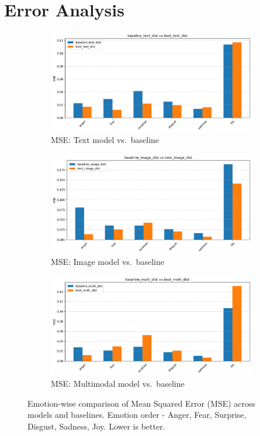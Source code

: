 \section{Error Analysis}
\label{sec:error-analysis}


\begin{figure}[h]
    \centering
    \begin{subfigure}[b]{0.48\textwidth}
        \includegraphics[width=\textwidth]{images/plot_1.png}
        \caption{MSE: Text model vs.\ baseline}
        \label{fig:mse-text}
    \end{subfigure}
    \hfill
    \begin{subfigure}[b]{0.48\textwidth}
        \includegraphics[width=\textwidth]{images/plot_2.png}
        \caption{MSE: Image model vs.\ baseline}
        \label{fig:mse-img}
    \end{subfigure}
    \begin{subfigure}[b]{0.48\textwidth}
        \includegraphics[width=\textwidth]{images/plot_3.png}
        \caption{MSE: Multimodal model vs.\ baseline}
        \label{fig:mse-multi}
    \end{subfigure}
    \caption{Emotion-wise comparison of Mean Squared Error (MSE) across models and baselines. Emotion order - Anger, Fear, Surprise, Disgust, Sadness, Joy. Lower is better.}
    \label{fig:mse-all}
\end{figure}

